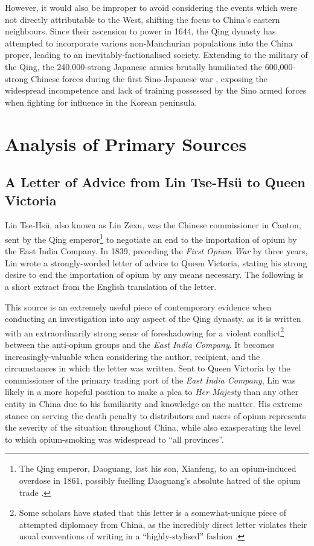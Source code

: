 \documentclass{article}
\begin{document}
However, it would also be improper to avoid considering the events which were not directly attributable to the West, shifting the focus to China's eastern neighbours. Since their ascension to power in 1644, the Qing dynasty has attempted to incorporate various non-Manchurian populations into the China proper, leading to an inevitably-factionalised society. Extending to the military of the Qing, the 240,000-strong Japanese armies brutally humiliated the 600,000-strong Chinese forces during the first Sino-Japanese war
\autocite{Fenby:2013}, exposing the widespread incompetence and lack of training possessed by the Sino armed forces
\autocite{Jowett:2013} when fighting for influence in the Korean peninsula.

\section{Analysis of Primary Sources}

\subsection{A Letter of Advice from Lin Tse-Hs\"u to Queen Victoria}

Lin Tse-Hs\"u, also known as Lin Zexu, was the Chinese commissioner in Canton, sent by the Qing emperor\footnote{The Qing emperor, Daoguang, lost his son, Xianfeng, to an opium-induced overdose in 1861, possibly fuelling Daoguang's absolute hatred of the opium trade
\autocite{Ringmar:2013}.} to negotiate an end to the importation of opium by the East India Company. In 1839, preceding the \textit{First Opium War} by three years, Lin wrote a strongly-worded letter of advice to Queen Victoria, stating his strong desire to end the importation of opium by any means necessary. The following is a short extract from the English translation of the letter.


This source is an extremely useful piece of contemporary evidence when conducting an investigation into any aspect of the Qing dynasty, as it is written with an extraordinarily strong sense of foreshadowing for a violent conflict\footnote{Some scholars have stated that this letter is a somewhat-unique piece of attempted diplomacy from China, as the incredibly direct letter violates their usual conventions of writing in a ``highly-stylised'' fashion
\autocite{Kishlansky:1995}.} between the anti-opium groups and the \textit{East India Company}. It becomes increasingly-valuable when considering the author, recipient, and the circumstances in which the letter was written. Sent to Queen Victoria by the commissioner of the primary trading port of the \textit{East India Company}, Lin was likely in a more hopeful position to make a plea to \textit{Her Majesty} than any other entity in China due to his familiarity and knowledge on the matter. His extreme stance on serving the death penalty to distributors and users of opium represents the severity of the situation throughout China, while also exasperating the level to which opium-smoking was widespread to ``all provinces''.
\end{document}
